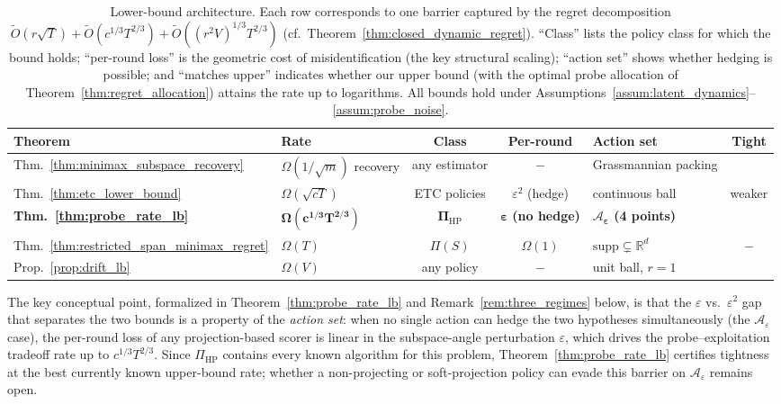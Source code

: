 \documentclass[11pt]{article}
\newcommand{\R}{\mathbb{R}}
\newcommand{\cA}{\mathcal{A}}
\newcommand{\supp}{\mathrm{supp}}
\newcommand{\cmark}{\ding{51}}
\begin{document}
\begin{table}[t]
\centering
\caption{Lower-bound architecture.
Each row corresponds to one barrier captured by the regret decomposition
$\widetilde O(r\sqrt T)+\widetilde O(c^{1/3}T^{2/3})+\widetilde O((r^2V)^{1/3}T^{2/3})$
(cf.\ Theorem~\ref{thm:closed_dynamic_regret}).
``Class'' lists the policy class for which the bound holds;
``per-round loss'' is the geometric cost of misidentification
(the key structural scaling); ``action set'' shows whether hedging is
possible; and ``matches upper'' indicates whether our upper bound (with
the optimal probe allocation of
Theorem~\ref{thm:regret_allocation}) attains the rate up to logarithms.
All bounds hold under
Assumptions~\ref{assum:latent_dynamics}--\ref{assum:probe_noise}.}
\label{tab:lb_architecture}
\small
\renewcommand{\arraystretch}{1.2}
\begin{tabularx}{\linewidth}{@{}l>{\raggedright\arraybackslash}X c c >{\raggedright\arraybackslash}X c@{}}
\toprule
\textbf{Theorem} & \textbf{Rate} & \textbf{Class} &
\textbf{Per-round} & \textbf{Action set} & \textbf{Tight} \\
\midrule
Thm.~\ref{thm:minimax_subspace_recovery} &
$\Omega(1/\sqrt m)$ recovery &
any estimator &
$-$ &
Grassmannian packing &
\cmark \\[2pt]
Thm.~\ref{thm:etc_lower_bound} &
$\Omega(\sqrt{cT})$ &
ETC policies &
$\varepsilon^2$ (hedge) &
continuous ball &
weaker \\[2pt]
\textbf{Thm.~\ref{thm:probe_rate_lb}} &
$\mathbf{\Omega(c^{1/3}T^{2/3})}$ &
$\boldsymbol{\Pi_{\mathrm{HP}}}$ &
$\boldsymbol{\varepsilon}$ \textbf{(no hedge)} &
$\boldsymbol{\cA_\varepsilon}$ \textbf{(4 points)} &
\cmark \\[2pt]
Thm.~\ref{thm:restricted_span_minimax_regret} &
$\Omega(T)$ &
$\Pi(S)$ &
$\Omega(1)$ &
$\supp\subsetneq\R^d$ &
$-$ \\[2pt]
Prop.~\ref{prop:drift_lb} &
$\Omega(V)$ &
any policy &
$-$ &
unit ball, $r=1$ &
\cmark \\
\bottomrule
\end{tabularx}
\end{table}

The key conceptual point, formalized in
Theorem~\ref{thm:probe_rate_lb} and Remark~\ref{rem:three_regimes} below,
is that the $\varepsilon$ vs.\ $\varepsilon^2$ gap that separates the two
bounds is a property of the \emph{action set}: when no single action can
hedge the two hypotheses simultaneously (the $\cA_\varepsilon$ case), the
per-round loss of any projection-based scorer is linear in the
subspace-angle perturbation $\varepsilon$, which drives the
probe--exploitation tradeoff rate up to $c^{1/3}T^{2/3}$.  Since
$\Pi_{\mathrm{HP}}$ contains every known algorithm for this problem,
Theorem~\ref{thm:probe_rate_lb} certifies tightness at the best currently
known upper-bound rate; whether a non-projecting or soft-projection policy
can evade this barrier on $\cA_\varepsilon$ remains open.
\end{document}
